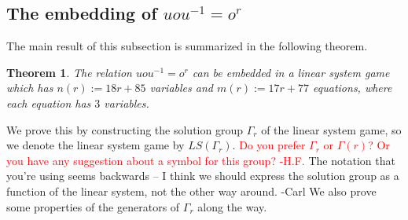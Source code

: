 \documentclass[11pt,letterpaper]{article}
\newcommand{\1}{\mathbb{1}}
\newcommand{\LS}{LS}
\def\carl#1{{\color{blue} #1 -Carl}}
\newcommand{\hfc}[1]{\textcolor{red}{#1 -H.F.}}
\newtheorem{theorem}{Theorem}[section]
\theoremstyle{definition}
\begin{document}
\subsection{The embedding of $uou^{-1} = o^r$}
The main result of this subsection is summarized in the following theorem.
\begin{theorem}
	The relation $uou^{-1} = o^r$ can be embedded in a linear system game which has
	$n(r) := 18r+85$ variables and $m(r) := 17r + 77$ equations, where each equation has $3$ variables.
\end{theorem}
We prove this by constructing the solution group $\Gamma_r$ of the linear system game,
so we denote the linear system game by $\LS(\Gamma_r)$.
\hfc{Do you prefer $\Gamma_r$ or $\Gamma(r)$? Or you have any suggestion about a symbol for this group?} \carl{The notation that you're using seems backwards -- I think we should express the solution group as a function of the linear system, not the other way around.}
We also prove some properties of the generators of $\Gamma_r$ along the way.
\end{document}
